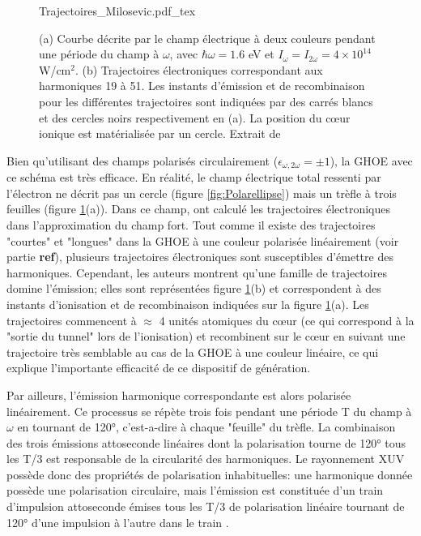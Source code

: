 \begin{figure}[ht]
\centering
\def\svgwidth{\textwidth}
{Trajectoires_Milosevic.pdf_tex}
\caption{(a) Courbe décrite par le champ électrique à deux couleurs pendant une période du champ à $\omega$, avec $\hbar \omega = 1.6$ eV et $I_{\omega} = I_{2\omega} = 4 \times 10^{14}$ W/cm$^2$. (b) Trajectoires électroniques correspondant aux harmoniques 19 à 51. Les instants d'émission et de recombinaison pour les différentes trajectoires sont indiquées par des carrés blancs et des cercles noirs respectivement en (a). La position du c\oe ur ionique est matérialisée par un cercle. Extrait de }
\label{fig:Trajectoires_Milosevic}
\end{figure}

Bien qu'utilisant des champs polarisés circulairement ($\epsilon_{\omega, 2\omega} = \pm 1$), la GHOE avec ce schéma est très efficace. En réalité, le champ électrique total ressenti par l'électron ne décrit pas un cercle (figure \ref{fig:Polarellipse}) mais un trèfle à trois feuilles (figure \ref{fig:Trajectoires_Milosevic}(a)). Dans ce champ,  ont calculé les trajectoires électroniques dans l'approximation du champ fort. Tout comme il existe des trajectoires "courtes" et "longues" dans la GHOE à une couleur polarisée linéairement (voir partie \textbf{ref}), plusieurs trajectoires électroniques sont susceptibles d'émettre des harmoniques. Cependant, les auteurs montrent qu'une famille de trajectoires domine l'émission; elles sont représentées figure \ref{fig:Trajectoires_Milosevic}(b) et correspondent à des instants d'ionisation et de recombinaison indiquées sur la figure \ref{fig:Trajectoires_Milosevic}(a). Les trajectoires commencent à $\approx$ 4 unités atomiques du c\oe ur (ce qui correspond à la "sortie du tunnel" lors de l'ionisation) et recombinent sur le c\oe ur en suivant une trajectoire très semblable au cas de la GHOE à une couleur linéaire, ce qui explique l'importante efficacité de ce dispositif de génération. 

Par ailleurs, l'émission harmonique correspondante est alors polarisée linéairement. Ce processus se répète trois fois pendant une période T du champ à $\omega$ en tournant de 120°, c'est-a-dire à chaque "feuille" du trèfle. La combinaison des trois émissions attoseconde linéaires dont la polarisation tourne de 120° tous les T/3 est responsable de la circularité des harmoniques. Le rayonnement XUV possède donc des propriétés de polarisation inhabituelles: une harmonique donnée possède une polarisation circulaire, mais l'émission est constituée d'un train d'impulsion attoseconde émises tous les T/3 de polarisation linéaire tournant de 120° d'une impulsion à l'autre dans le train .

